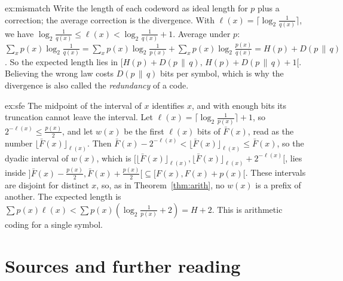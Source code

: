 \begin{solution}{ex:mismatch}
\idea Write the length of each codeword as ideal length for $p$ plus a correction; the average correction is the divergence.
\writeup With $\ell(x)=\lceil\log_2\frac1{q(x)}\rceil$, we have $\log_2\frac1{q(x)}\le\ell(x)<\log_2\frac1{q(x)}+1$. Average under $p$: $\sum_xp(x)\log_2\frac1{q(x)}=\sum_xp(x)\log_2\frac1{p(x)}+\sum_xp(x)\log_2\frac{p(x)}{q(x)}=H(p)+D(p\,\|\,q)$. So the expected length lies in $[H(p)+D(p\,\|\,q),\,H(p)+D(p\,\|\,q)+1[$. Believing the wrong law costs $D(p\,\|\,q)$ bits per symbol, which is why the divergence is also called the \emph{redundancy} of a code.
\end{solution}

\begin{solution}{ex:sfe}
\idea The midpoint of the interval of $x$ identifies $x$, and with enough bits its truncation cannot leave the interval.
\writeup Let $\ell(x)=\lceil\log_2\frac1{p(x)}\rceil+1$, so $2^{-\ell(x)}\le\frac{p(x)}2$, and let $w(x)$ be the first $\ell(x)$ bits of $\bar F(x)$, read as the number $\lfloor\bar F(x)\rfloor_{\ell(x)}$. Then $\bar F(x)-2^{-\ell(x)}<\lfloor\bar F(x)\rfloor_{\ell(x)}\le\bar F(x)$, so the dyadic interval of $w(x)$, which is $\bigl[\lfloor\bar F(x)\rfloor_{\ell(x)},\lfloor\bar F(x)\rfloor_{\ell(x)}+2^{-\ell(x)}\bigr[$, lies inside $\bigl]\bar F(x)-\frac{p(x)}2,\bar F(x)+\frac{p(x)}2\bigr[\subseteq[F(x),F(x)+p(x)[$. These intervals are disjoint for distinct $x$, so, as in Theorem~\ref{thm:arith}, no $w(x)$ is a prefix of another. The expected length is $\sum p(x)\ell(x)<\sum p(x)(\log_2\frac1{p(x)}+2)=H+2$. This is arithmetic coding for a single symbol.
\end{solution}

\section*{Sources and further reading}

